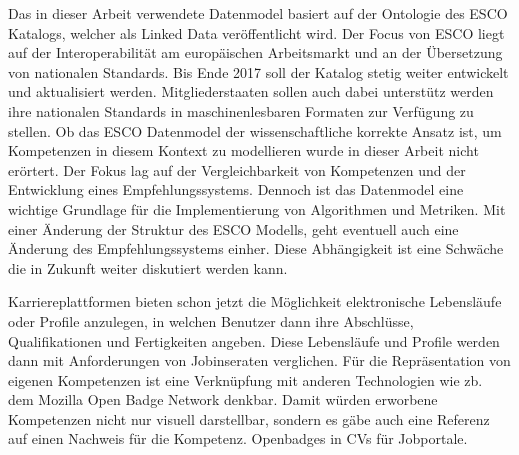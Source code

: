 Das in dieser Arbeit verwendete Datenmodel basiert auf der Ontologie des ESCO Katalogs, welcher als Linked Data veröffentlicht wird. Der Focus von ESCO liegt auf der Interoperabilität am europäischen Arbeitsmarkt und an der Übersetzung von nationalen Standards. Bis Ende 2017 soll der Katalog stetig weiter entwickelt und aktualisiert werden. Mitgliederstaaten sollen auch dabei unterstütz werden ihre nationalen Standards in maschinenlesbaren Formaten zur Verfügung zu stellen. 
\newline
Ob das ESCO Datenmodel der wissenschaftliche korrekte Ansatz ist, um Kompetenzen in diesem Kontext zu modellieren wurde in dieser Arbeit nicht erörtert. Der Fokus lag auf der Vergleichbarkeit von Kompetenzen und der Entwicklung eines Empfehlungssystems. Dennoch ist das Datenmodel eine wichtige Grundlage für die Implementierung von Algorithmen und Metriken. Mit einer Änderung der Struktur des ESCO Modells, geht eventuell auch eine Änderung des Empfehlungssystems einher. Diese Abhängigkeit ist eine Schwäche die in Zukunft weiter diskutiert werden kann.

Karriereplattformen bieten schon jetzt die Möglichkeit elektronische Lebensläufe oder Profile anzulegen, in welchen Benutzer dann ihre Abschlüsse, Qualifikationen und Fertigkeiten angeben. Diese Lebensläufe und Profile werden dann mit Anforderungen von Jobinseraten verglichen. Für die Repräsentation von eigenen Kompetenzen ist eine Verknüpfung mit anderen Technologien wie zb. dem Mozilla Open Badge Network denkbar. Damit würden erworbene Kompetenzen nicht nur visuell darstellbar, sondern es gäbe auch eine Referenz auf einen Nachweis für die Kompetenz. 
Openbadges in CVs für Jobportale.

